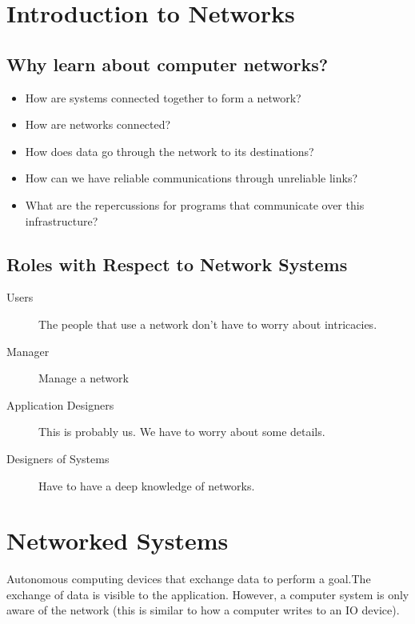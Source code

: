 \section{Introduction to Networks}\label{sec:introduction_to_networks}

\subsection{Why learn about computer networks?}\label{sub:why_learn_about_computer_networks_}

\begin{itemize}
    \item   How are systems connected together to form a network?
    \item How are networks connected?
    \item How does data go through the network to its destinations?
    \item How can we have reliable communications through unreliable links?
    \item What are the repercussions for programs that communicate over this infrastructure?
\end{itemize}

\subsection{Roles with Respect to Network Systems}\label{sub:roles_with_respect_to_network_systems}

\begin{description}
    \item[Users] The people that use a network don't have to worry about intricacies.
    \item[Manager] Manage a network
    \item[Application Designers] This is probably us. We have to worry about some details.
    \item[Designers of Systems] Have to have a deep knowledge of networks.
\end{description}

\section{Networked Systems}\label{sec:networked_systems}

Autonomous computing devices that exchange data to perform a goal.The exchange of data is visible to the application.
However, a computer system is only aware of the network (this is similar to how a computer writes to an IO device).

